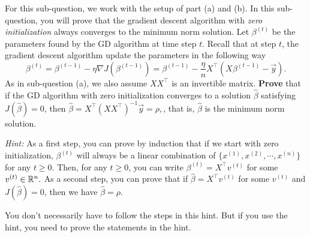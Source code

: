 \item {} 
For this sub-question, we work with the setup of part (a) and (b). In this sub-question, you will prove that the gradient descent algorithm with \emph{zero initialization} always converges to the minimum norm solution. Let $\beta^{(t)}$ be the parameters found by the GD algorithm at time step $t$. Recall that at step $t$, the gradient descent algorithm update the parameters in the following way
\begin{equation}
	\beta^{(t)}=\beta^{(t-1)}-\eta\nabla J(\beta^{(t-1)})=\beta^{(t-1)}-\frac{\eta}{n} X^\top (X\beta^{(t-1)}-\vec{y}).
\end{equation}
As in sub-question (a), we also assume $X X^\top$ is an invertible matrix. \textbf{Prove} that if the GD algorithm  with zero initialization converges to a solution $\hat{\beta}$ satisfying $J(\hat{\beta})=0$, then $\hat{\beta}=X^\top(XX^\top)^{-1}\vec{y}=\rho,$, that is, $\hat{\beta}$ is the minimum norm solution.

\emph{Hint:} As a first step, you can prove by induction that if we start with zero initialization, $\beta^{(t)}$ will always be a linear combination of $\{x^{(1)}, x^{(2)}, \cdots, x^{(n)}\}$ for any $t\ge 0.$ Then, for any $t\ge 0$, you can write $\beta^{(t)}=X^\top v^{(t)}$ for some $v^{(t)}\in \mathbb{R}^{n}.$ As a second step, you can prove that if $\hat{\beta}=X^\top v^{(t)}$ for some $v^{(t)}$ and $J(\hat{\beta})=0$, then we have $\hat{\beta}=\rho.$

You don't necessarily have to follow the steps in this hint. But if you use the hint, you need to prove the statements in the hint.
